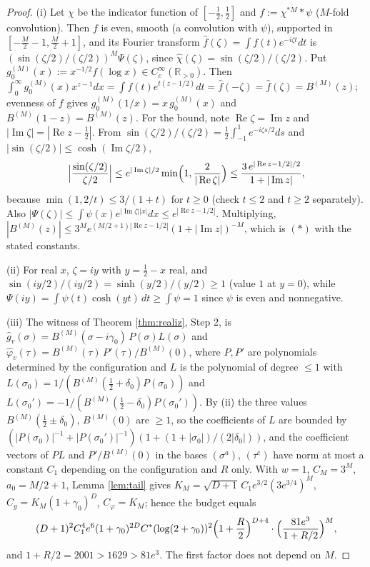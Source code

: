 \documentclass[11pt,reqno]{amsart}
\theoremstyle{definition}
\newcommand{\R}{\mathbb{R}}
\newcommand{\half}{\tfrac12}
\begin{document}
\begin{proof}
(i) Let \(\chi\) be the indicator function of \([-\half,\half]\) and
\(f:=\chi^{*M}*\psi\) (\(M\)-fold convolution). Then \(f\) is even, smooth (a
convolution with \(\psi\)), supported in \([-\tfrac M2-1,\tfrac M2+1]\), and
its Fourier transform \(\hat f(\zeta)=\int f(t)e^{-i\zeta t}dt\) is
\((\sin(\zeta/2)/(\zeta/2))^M\Psi(\zeta)\), since
\(\hat\chi(\zeta)=\sin(\zeta/2)/(\zeta/2)\). Put
\(g_0^{(M)}(x):=x^{-1/2}f(\log x)\in C_c^\infty(\R_{>0})\). Then
\(\int_0^\infty g_0^{(M)}(x)x^{z-1}dx=\int f(t)e^{t(z-1/2)}dt=\hat f(-\zeta)
=\hat f(\zeta)=B^{(M)}(z)\); evenness of \(f\) gives
\(g_0^{(M)}(1/x)=x\,g_0^{(M)}(x)\) and \(B^{(M)}(1-z)=B^{(M)}(z)\). For the
bound, note \(\operatorname{Re}\zeta=\operatorname{Im}z\) and
\(|\operatorname{Im}\zeta|=|\operatorname{Re}z-\half|\). From
\(\sin(\zeta/2)/(\zeta/2)=\half\int_{-1}^1e^{-i\zeta s/2}ds\) and
\(|\sin(\zeta/2)|\leq\cosh(\operatorname{Im}\zeta/2)\),
\[
\Bigl|\frac{\sin(\zeta/2)}{\zeta/2}\Bigr|\leq
e^{|\operatorname{Im}\zeta|/2}\min\Bigl(1,\frac2{|\operatorname{Re}\zeta|}\Bigr)
\leq\frac{3\,e^{|\operatorname{Re}z-1/2|/2}}{1+|\operatorname{Im}z|},
\]
because \(\min(1,2/t)\leq3/(1+t)\) for \(t\geq0\) (check \(t\leq2\) and
\(t\geq2\) separately). Also
\(|\Psi(\zeta)|\leq\int\psi(x)e^{|\operatorname{Im}\zeta||x|}dx\leq
e^{|\operatorname{Re}z-1/2|}\). Multiplying,
\(|B^{(M)}(z)|\leq3^Me^{(M/2+1)|\operatorname{Re}z-1/2|}(1+|\operatorname{Im}z|)^{-M}\),
which is \((\ast)\) with the stated constants.

(ii) For real \(x\), \(\zeta=iy\) with \(y=\half-x\) real, and
\(\sin(iy/2)/(iy/2)=\sinh(y/2)/(y/2)\geq1\) (value \(1\) at \(y=0\)), while
\(\Psi(iy)=\int\psi(t)\cosh(yt)\,dt\geq\int\psi=1\) since \(\psi\) is even and
nonnegative.

(iii) The witness of Theorem \ref{thm:realiz}, Step 2, is
\(\hat g_v(\sigma)=B^{(M)}(\sigma-i\gamma_0)\,P(\sigma)L(\sigma)\) and
\(\hat\varphi_v(\tau)=B^{(M)}(\tau)\,P'(\tau)/B^{(M)}(0)\), where \(P,P'\)
are polynomials determined by the configuration and \(L\) is the polynomial of
degree \(\leq1\) with \(L(\sigma_0)=1/(B^{(M)}(\half+\delta_0)P(\sigma_0))\)
and \(L(\sigma_0')=-1/(B^{(M)}(\half-\delta_0)P(\sigma_0'))\). By (ii) the three
values \(B^{(M)}(\half\pm\delta_0)\), \(B^{(M)}(0)\) are \(\geq1\), so the
coefficients of \(L\) are bounded by
\((|P(\sigma_0)|^{-1}+|P(\sigma_0')|^{-1})(1+(1+|\sigma_0|)/(2|\delta_0|))\),
and the coefficient vectors of \(PL\) and \(P'/B^{(M)}(0)\) in the bases
\((\sigma^a)\), \((\tau^e)\) have norm at most a constant \(C_1\) depending
on the configuration and \(R\) only. With \(w=1\), \(C_M=3^M\),
\(a_0=M/2+1\), Lemma \ref{lem:tail} gives
\(K_M=\sqrt{D+1}\,C_1e^{3/2}(3e^{3/4})^M\), \(C_g=K_M(1+\gamma_0)^D\),
\(C_\varphi=K_M\); hence the budget equals
\[
(D+1)^2C_1^4e^6(1+\gamma_0)^{2D}C^*(\log(2+\gamma_0))^2
\Bigl(1+\frac R2\Bigr)^{D+4}\cdot\Bigl(\frac{81e^3}{1+R/2}\Bigr)^{M},
\]
and \(1+R/2=2001>1629>81e^3\). The first factor does not depend on \(M\).
\end{proof}
\end{document}
